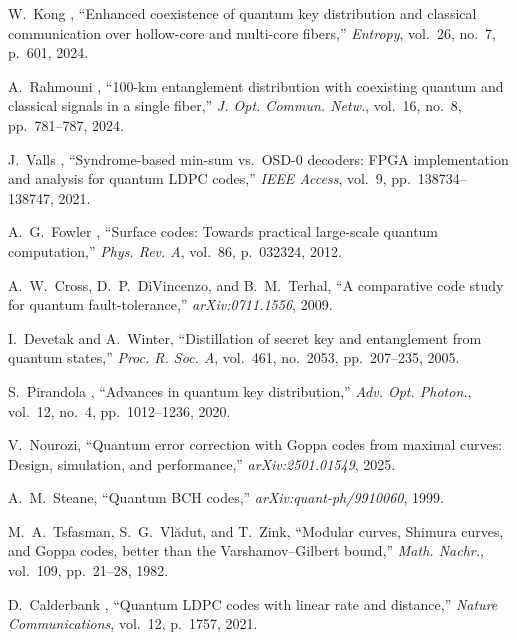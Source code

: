 \begin{thebibliography}{99}

W.~Kong \etal, ``Enhanced coexistence of quantum key distribution and classical communication over hollow-core and multi-core fibers,'' \emph{Entropy}, vol.~26, no.~7, p.~601, 2024.

A.~Rahmouni \etal, ``100-km entanglement distribution with coexisting quantum and classical signals in a single fiber,'' \emph{J. Opt. Commun. Netw.}, vol.~16, no.~8, pp.~781--787, 2024.

J.~Valls \etal, ``Syndrome-based min-sum vs.\ OSD-0 decoders: FPGA implementation and analysis for quantum LDPC codes,'' \emph{IEEE Access}, vol.~9, pp.~138734--138747, 2021.

A.~G.~Fowler \etal, ``Surface codes: Towards practical large-scale quantum computation,'' \emph{Phys. Rev. A}, vol.~86, p.~032324, 2012.

A.~W.~Cross, D.~P.~DiVincenzo, and B.~M.~Terhal, ``A comparative code study for quantum fault-tolerance,'' \emph{arXiv:0711.1556}, 2009.

I.~Devetak and A.~Winter, ``Distillation of secret key and entanglement from quantum states,'' \emph{Proc. R. Soc. A}, vol.~461, no.~2053, pp.~207--235, 2005.

S.~Pirandola \etal, ``Advances in quantum key distribution,'' \emph{Adv. Opt. Photon.}, vol.~12, no.~4, pp.~1012--1236, 2020.

V.~Nourozi, ``Quantum error correction with Goppa codes from maximal curves: Design, simulation, and performance,'' \emph{arXiv:2501.01549}, 2025.

A.~M.~Steane, ``Quantum BCH codes,'' \emph{arXiv:quant-ph/9910060}, 1999.

M.~A.~Tsfasman, S.~G.~Vl\u{a}dut, and T.~Zink, ``Modular curves, Shimura curves, and Goppa codes, better than the Varshamov--Gilbert bound,'' \emph{Math. Nachr.}, vol.~109, pp.~21--28, 1982.

D.~Calderbank \etal, ``Quantum LDPC codes with linear rate and distance,'' \emph{Nature Communications}, vol.~12, p.~1757, 2021.

\end{thebibliography}

